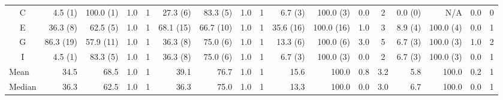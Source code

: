 \begin{landscape}
\begin{table}
{\begin{tabular}{@{}crrrrrrrrrrrrrrrr@{}}
        \multicolumn{1}{c|}{C}              & 4.5 (1)   & 100.0 (1) & 1.0  & \multicolumn{1}{c|}{1}    & 27.3 (6)                 & 83.3 (5)                 & 1.0                      & \multicolumn{1}{c|}{1}    & 6.7 (3)   & 100.0 (3)                & 0.0                      & \multicolumn{1}{c|}{2}    & 0.0 (0)                  & N/A                      & 0.0                      & 0                        \\
        \multicolumn{1}{c|}{E}              & 36.3 (8)  & 62.5 (5)  & 1.0  & \multicolumn{1}{c|}{1}    & 68.1 (15)                & 66.7 (10)                & 1.0                      & \multicolumn{1}{c|}{1}    & 35.6 (16) & 100.0 (16)               & 1.0                      & \multicolumn{1}{c|}{3}    & 8.9 (4)                  & 100.0 (4)                & 0.0                      & 1                        \\
        \multicolumn{1}{c|}{G}              & 86.3 (19) & 57.9 (11) & 1.0  & \multicolumn{1}{c|}{1}    & 36.3 (8)                 & 75.0 (6)                 & 1.0                      & \multicolumn{1}{c|}{1}    & 13.3 (6)  & 100.0 (6)                & 3.0                      & \multicolumn{1}{c|}{5}    & 6.7 (3)                  & 100.0 (3)                & 1.0                      & 2                        \\
        \multicolumn{1}{c|}{I}              & 4.5 (1)   & 83.3 (5)  & 1.0  & \multicolumn{1}{c|}{1}    & 36.3 (8)                 & 75.0 (6)                 & 1.0                      & \multicolumn{1}{c|}{1}    & 6.7 (3)   & 100.0 (3)                & 0.0                      & \multicolumn{1}{c|}{2}    & 6.7 (3)                  & 100.0 (3)                & 0.0                      & 1                        \\ \midrule
        \multicolumn{1}{l|}{Mean}           & 34.5      & 68.5      & 1.0  & \multicolumn{1}{c|}{1}    & 39.1                     & 76.7                     & 1.0                      & \multicolumn{1}{c|}{1}    & 15.6      & 100.0                    & 0.8                      & \multicolumn{1}{c|}{3.2}  & 5.8                      & 100.0                    & 0.2                      & 1                        \\
        \multicolumn{1}{l|}{Median}         & 36.3      & 62.5      & 1.0  & \multicolumn{1}{c|}{1}    & 36.3                     & 75.0                     & 1.0                      & \multicolumn{1}{c|}{1}    & 13.3      & 100.0                    & 0.0                      & \multicolumn{1}{c|}{3.0}  & 6.7                      & 100.0                    & 0.0                      & 1                        \\ \bottomrule
      \end{tabular}
    }%
    \label{tab:Results-Quantitative-AB}
  \end{table}
\end{landscape}

